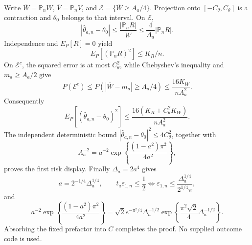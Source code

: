 Write \(\overline W=\mathbb P_nW\), \(\overline V=\mathbb P_nV\), and \(\mathcal E=\{\overline W\ge A_a/4\}\).  Projection onto \([-C_{\theta},C_{\theta}]\) is a contraction and \(\theta_0\) belongs to that interval.  On \(\mathcal E\),
\[
 |\widehat\theta_{a,n}-\theta_0|
 \le\frac{|\mathbb P_nR|}{\overline W}
 \le\frac4{A_a}|\mathbb P_nR|.
\]
Independence and \(E_P[R]=0\) yield
\[
 E_P[(\mathbb P_nR)^2]\le K_R/n.
\]
On \(\mathcal E^c\), the squared error is at most \(C_{\theta}^2\), while Chebyshev's inequality and \(m_a\ge A_a/2\) give
\[
 P(\mathcal E^c)
 \le P(|\overline W-m_a|\ge A_a/4)
 \le\frac{16K_W}{nA_a^2}.
\]
Consequently
\[
 E_P[(\widehat\theta_{a,n}-\theta_0)^2]
 \le\frac{16(K_R+C_{\theta}^2K_W)}{nA_a^2}.
\]
The independent deterministic bound \(|\widehat\theta_{a,n}-\theta_0|^2\le4C_{\theta}^2\), together with
\[
 A_a^{-2}=a^{-2}\exp\!\left\{\frac{(1-a^2)\pi^2}{4a^2}\right\},
\]
proves the first risk display.  Finally \(\Delta_a=2a^4\) gives
\[
 a=2^{-1/4}\Delta_a^{1/4},
 \qquad
 t_a\varepsilon_{1,n}\le\frac12
 \Longleftrightarrow
 \varepsilon_{1,n}\le\frac{\Delta_a^{1/4}}{2^{1/4}\pi},
\]
and
\[
 a^{-2}\exp\!\left\{\frac{(1-a^2)\pi^2}{4a^2}\right\}
 =\sqrt2e^{-\pi^2/4}\Delta_a^{-1/2}
 \exp\!\left\{\frac{\pi^2\sqrt2}{4}\Delta_a^{-1/2}\right\}.
\]
Absorbing the fixed prefactor into \(C\) completes the proof.  No supplied outcome code is used.